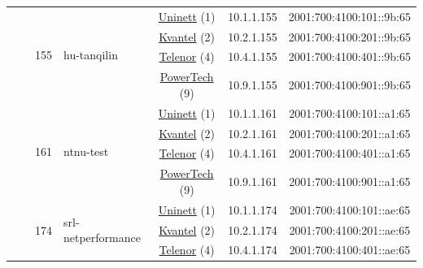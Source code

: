 \begin{small}
\begin{center}
\begin{longtable}{|c|c|c|c|c|c|c|c|}
  &  & \multirow{4}{*}{\tiny{155}} & \multicolumn{1}{|l|}{\multirow{4}{*}{\tiny{hu-tanqilin}}} & \multicolumn{2}{|c|}{\tiny{\href{https://www.uninett.no}{Uninett} (1)}} & \tiny{10.1.1.155} & \tiny{2001:700:4100:101::9b:65} \\* \cline{5-5}\cline{6-6}\cline{7-7}\cline{8-8}
  &  &  &  & \multicolumn{2}{|c|}{\tiny{\href{http://kvantel.no}{Kvantel} (2)}} & \tiny{10.2.1.155} & \tiny{2001:700:4100:201::9b:65} \\* \cline{5-5}\cline{6-6}\cline{7-7}\cline{8-8}
  &  &  &  & \multicolumn{2}{|c|}{\tiny{\href{https://www.telenor.no}{Telenor} (4)}} & \tiny{10.4.1.155} & \tiny{2001:700:4100:401::9b:65} \\* \cline{5-5}\cline{6-6}\cline{7-7}\cline{8-8}
  &  &  &  & \multicolumn{2}{|c|}{\tiny{\href{http://www.powertech.no}{PowerTech} (9)}} & \tiny{10.9.1.155} & \tiny{2001:700:4100:901::9b:65} \\* \cline{3-3}\cline{4-4}\cline{5-5}\cline{6-6}\cline{7-7}\cline{8-8}
  &  & \multirow{4}{*}{\tiny{161}} & \multicolumn{1}{|l|}{\multirow{4}{*}{\tiny{ntnu-test}}} & \multicolumn{2}{|c|}{\tiny{\href{https://www.uninett.no}{Uninett} (1)}} & \tiny{10.1.1.161} & \tiny{2001:700:4100:101::a1:65} \\* \cline{5-5}\cline{6-6}\cline{7-7}\cline{8-8}
  &  &  &  & \multicolumn{2}{|c|}{\tiny{\href{http://kvantel.no}{Kvantel} (2)}} & \tiny{10.2.1.161} & \tiny{2001:700:4100:201::a1:65} \\* \cline{5-5}\cline{6-6}\cline{7-7}\cline{8-8}
  &  &  &  & \multicolumn{2}{|c|}{\tiny{\href{https://www.telenor.no}{Telenor} (4)}} & \tiny{10.4.1.161} & \tiny{2001:700:4100:401::a1:65} \\* \cline{5-5}\cline{6-6}\cline{7-7}\cline{8-8}
  &  &  &  & \multicolumn{2}{|c|}{\tiny{\href{http://www.powertech.no}{PowerTech} (9)}} & \tiny{10.9.1.161} & \tiny{2001:700:4100:901::a1:65} \\* \cline{3-3}\cline{4-4}\cline{5-5}\cline{6-6}\cline{7-7}\cline{8-8}
  &  & \multirow{4}{*}{\tiny{174}} & \multicolumn{1}{|l|}{\multirow{4}{*}{\tiny{srl-netperformance}}} & \multicolumn{2}{|c|}{\tiny{\href{https://www.uninett.no}{Uninett} (1)}} & \tiny{10.1.1.174} & \tiny{2001:700:4100:101::ae:65} \\* \cline{5-5}\cline{6-6}\cline{7-7}\cline{8-8}
  &  &  &  & \multicolumn{2}{|c|}{\tiny{\href{http://kvantel.no}{Kvantel} (2)}} & \tiny{10.2.1.174} & \tiny{2001:700:4100:201::ae:65} \\* \cline{5-5}\cline{6-6}\cline{7-7}\cline{8-8}
  &  &  &  & \multicolumn{2}{|c|}{\tiny{\href{https://www.telenor.no}{Telenor} (4)}} & \tiny{10.4.1.174} & \tiny{2001:700:4100:401::ae:65} \\* \cline{5-5}\cline{6-6}\cline{7-7}\cline{8-8}

\end{longtable}
\end{center}
\end{small}
